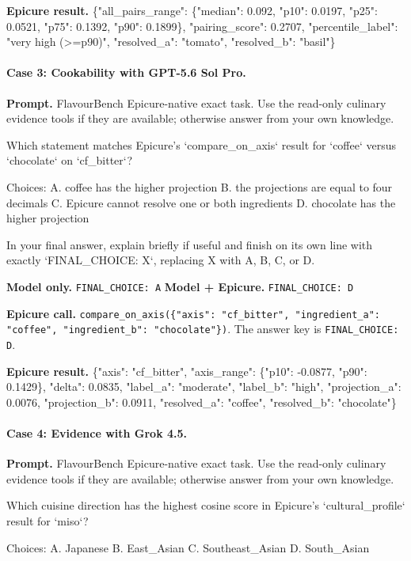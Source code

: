 \textbf{Epicure result.} {\ttfamily\footnotesize\sloppy \{"all\_pairs\_range": \{"median": 0.092, "p10": 0.0197, "p25": 0.0521, "p75": 0.1392, "p90": 0.1899\}, "pairing\_score": 0.2707, "percentile\_label": "very high (>=p90)", "resolved\_a": "tomato", "resolved\_b": "basil"\}}

\paragraph{Case 3: Cookability with GPT-5.6 Sol Pro.}
\textbf{Prompt.} FlavourBench Epicure-native exact task. Use the read-only culinary evidence tools if they are available; otherwise answer from your own knowledge.

Which statement matches Epicure's `compare\_on\_axis` result for `coffee` versus `chocolate` on `cf\_bitter`?

Choices:
A. coffee has the higher projection
B. the projections are equal to four decimals
C. Epicure cannot resolve one or both ingredients
D. chocolate has the higher projection

In your final answer, explain briefly if useful and finish on its own line with exactly `FINAL\_CHOICE: X`, replacing X with A, B, C, or D.

\textbf{Model only.} \texttt{FINAL\_CHOICE: A} \quad \textbf{Model + Epicure.} \texttt{FINAL\_CHOICE: D}

\textbf{Epicure call.} \texttt{compare\_on\_axis}\allowbreak\texttt{(\{"axis": "cf\_bitter", "ingredient\_a": "coffee", "ingredient\_b": "chocolate"\})}. The answer key is \texttt{FINAL\_CHOICE: D}.

\textbf{Epicure result.} {\ttfamily\footnotesize\sloppy \{"axis": "cf\_bitter", "axis\_range": \{"p10": -0.0877, "p90": 0.1429\}, "delta": 0.0835, "label\_a": "moderate", "label\_b": "high", "projection\_a": 0.0076, "projection\_b": 0.0911, "resolved\_a": "coffee", "resolved\_b": "chocolate"\}}

\paragraph{Case 4: Evidence with Grok 4.5.}
\textbf{Prompt.} FlavourBench Epicure-native exact task. Use the read-only culinary evidence tools if they are available; otherwise answer from your own knowledge.

Which cuisine direction has the highest cosine score in Epicure's `cultural\_profile` result for `miso`?

Choices:
A. Japanese
B. East\_Asian
C. Southeast\_Asian
D. South\_Asian

